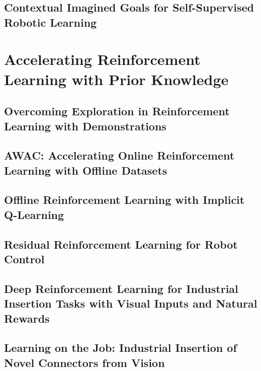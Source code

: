 \documentclass[ titlepage,numbers=noenddot,headinclude,
                footinclude=true,cleardoublepage=empty,abstractoff,
                BCOR=5mm,paper=letter,fontsize=12pt,
                american,
                openany
                ]{scrreprt}
\begin{document}
\chapter{Contextual Imagined Goals for Self-Supervised Robotic Learning}\label{chapter:ccrig}

\part{Accelerating Reinforcement Learning with Prior Knowledge}

 \chapter{Overcoming Exploration in Reinforcement Learning with Demonstrations}\label{chapter:bcddpg}

\chapter{AWAC: Accelerating Online Reinforcement Learning with Offline Datasets}\label{chapter:awac}

\chapter{Offline Reinforcement Learning with Implicit Q-Learning}\label{chapter:iql}

\chapter{Residual Reinforcement Learning for Robot Control}\label{chapter:residualrl}

\chapter{Deep Reinforcement Learning for Industrial Insertion Tasks with Visual Inputs and Natural Rewards}\label{chapter:insertion}

\chapter{Learning on the Job: Industrial Insertion of Novel Connectors from Vision}\label{chapter:daib}
\end{document}
